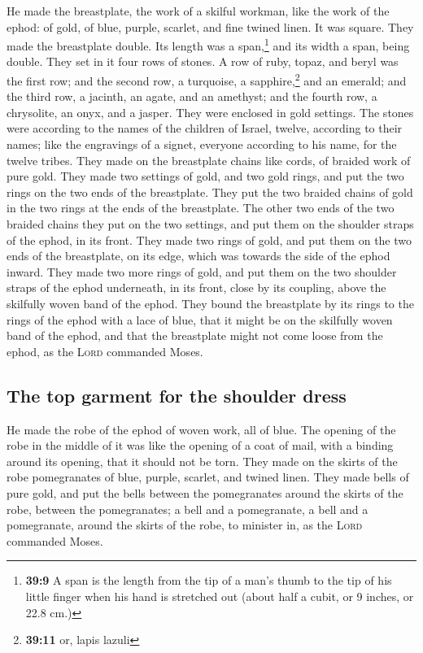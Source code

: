  He made the breastplate, the work of a skilful workman,
like the work of the ephod: of gold, of blue, purple, scarlet, and fine
twined linen.  It was square. They made the breastplate
double. Its length was a span,\footnote{\textbf{39:9} A span is the
  length from the tip of a man's thumb to the tip of his little finger
  when his hand is stretched out (about half a cubit, or 9 inches, or
  22.8 cm.)} and its width a span, being double.  They
set in it four rows of stones. A row of ruby, topaz, and beryl was the
first row;  and the second row, a turquoise, a
sapphire,\footnote{\textbf{39:11} or, lapis lazuli} and an emerald;
 and the third row, a jacinth, an agate, and an amethyst;
 and the fourth row, a chrysolite, an onyx, and a jasper.
They were enclosed in gold settings.  The stones were
according to the names of the children of Israel, twelve, according to
their names; like the engravings of a signet, everyone according to his
name, for the twelve tribes.  They made on the
breastplate chains like cords, of braided work of pure gold.
 They made two settings of gold, and two gold rings, and
put the two rings on the two ends of the breastplate. 
They put the two braided chains of gold in the two rings at the ends of
the breastplate.  The other two ends of the two braided
chains they put on the two settings, and put them on the shoulder straps
of the ephod, in its front.  They made two rings of gold,
and put them on the two ends of the breastplate, on its edge, which was
towards the side of the ephod inward.  They made two more
rings of gold, and put them on the two shoulder straps of the ephod
underneath, in its front, close by its coupling, above the skilfully
woven band of the ephod.  They bound the breastplate by
its rings to the rings of the ephod with a lace of blue, that it might
be on the skilfully woven band of the ephod, and that the breastplate
might not come loose from the ephod, as the \textsc{Lord} commanded
Moses.

\hypertarget{the-top-garment-for-the-shoulder-dress-1}{%
\subsection{The top garment for the shoulder
dress}\label{the-top-garment-for-the-shoulder-dress-1}}

 He made the robe of the ephod of woven work, all of
blue.  The opening of the robe in the middle of it was
like the opening of a coat of mail, with a binding around its opening,
that it should not be torn.  They made on the skirts of
the robe pomegranates of blue, purple, scarlet, and twined linen.
 They made bells of pure gold, and put the bells between
the pomegranates around the skirts of the robe, between the
pomegranates;  a bell and a pomegranate, a bell and a
pomegranate, around the skirts of the robe, to minister in, as the
\textsc{Lord} commanded Moses.

